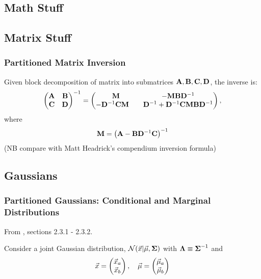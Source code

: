 \documentclass[11pt]{article}
\begin{document}
\newpage
\begin{appendices}
  \section{Math Stuff}

  \subsection{Matrix Stuff}
  \subsubsection{Partitioned Matrix Inversion}
  Given block decomposition of matrix into submatrices
  $\mathbf{A}, \mathbf{B}, \mathbf{C}, \mathbf{D}$, the inverse is:
  \begin{equation}
    \left(
      \begin{matrix}
        \mathbf{A} & \mathbf{B} \\
        \mathbf{C} & \mathbf{D}
      \end{matrix}
    \right)^{-1}
    =
    \left(
      \begin{matrix}
        \mathbf{M}                     & - \mathbf{M} \mathbf{B} \mathbf{D}^{-1} \\
        -\mathbf{D}^{-1} \mathbf{C} \mathbf{M} \quad & \mathbf{D}^{-1} + \mathbf{D}^{-1} \mathbf{C} \mathbf{M} \mathbf{B} \mathbf{D}^{-1}
      \end{matrix}
    \right),
  \end{equation}
  where
  \begin{equation}
    \mathbf{M} = \left(\mathbf{A} - \mathbf{B} \mathbf{D}^{-1} \mathbf{C} \right)^{-1}
  \end{equation}
  (NB compare with Matt Headrick's compendium inversion formula)


\subsection{Gaussians}
\subsubsection{Partitioned Gaussians: Conditional and Marginal Distributions}
From \cite{BISHOP}, sections 2.3.1 - 2.3.2.

Consider a joint Gaussian distribution, $\mathcal{N}(\vec{x} | \vec{\mu}, \boldsymbol{\Sigma})$ with
$\boldsymbol{\Lambda} \equiv \boldsymbol{\Sigma}^{-1}$ and
\begin{equation}
  \vec{x} =
  \left(
    \begin{matrix}
      \vec{x}_a \\
      \vec{x}_b
    \end{matrix}
  \right)
  , \quad
  \vec{\mu} =
  \left(
    \begin{matrix}
      \vec{\mu}_a \\
      \vec{\mu}_b
    \end{matrix}
  \right)
\end{equation}


\end{appendices}
\end{document}
